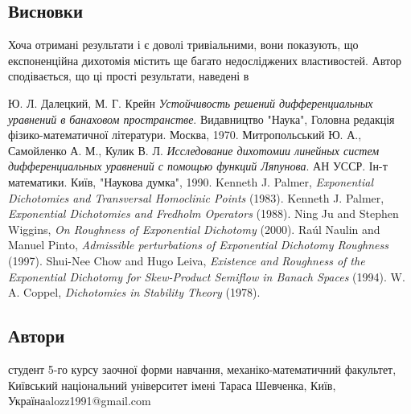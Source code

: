 \documentclass{SHVpaper}
\begin{document}
\subsection{Висновки}
Хоча отримані результати і є доволі тривіальними, вони показують, що експоненційна дихотомія містить ще багато недосліджених 
властивостей. Автор сподівається, що ці прості результати, наведені в 
\begin{thebibliography}{99}
Ю. Л. Далецкий, М. Г. Крейн
\emph{Устойчивость решений дифференциальных уравнений в банаховом пространстве}.
Видавництво "Наука"{}, Головна редакція фізико-математичної літератури. Москва, 1970.
Митропольський Ю. А., Самойленко А. М., Кулик В. Л.
\emph{Исследование дихотомии линейных систем дифференциальных уравнений с помощью функций Ляпунова}.
АН УССР. Ін-т математики. Київ, "Наукова думка", 1990.
	Kenneth J. Palmer, {\em Exponential Dichotomies and Transversal Homoclinic Points} (1983).
	Kenneth J. Palmer, {\em Exponential Dichotomies and Fredholm Operators} (1988).
	Ning Ju and Stephen Wiggins, {\em On Roughness of Exponential Dichotomy} (2000).
	Ra\'ul Naulin and Manuel Pinto, {\em Admissible perturbations of Exponential Dichotomy Roughness} (1997).
	Shui-Nee Chow and Hugo Leiva, {\em Existence and Roughness of the Exponential Dichotomy for Skew-Product Semiflow in Banach Spaces} (1994).
	W. A. Coppel, {\em Dichotomies in Stability Theory} (1978).
\end{thebibliography}

\subsection{Автори}
\author{Олексій Костянтинович Леонтьєв}{студент 5-го курсу заочної форми навчання, механіко-математичний факультет,
Київський національний університет імені Тараса Шевченка, Київ, Україна}{alozz1991@gmail.com}
\end{document}

